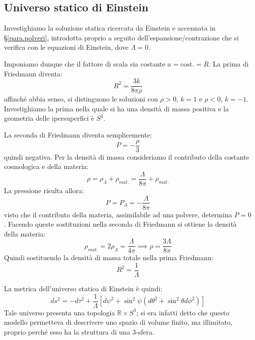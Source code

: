 \subsection{Universo statico di Einstein}
Investighiamo la soluzione statica ricercata da Einstein e accennata in \S\ref{para.polveri}, introdotta proprio a seguito dell'espansione/contrazione che si verifica con le  equazioni di Einstein, dove $\Lambda = 0$.

Imponiamo dunque che il fattore di scala sia costante $a = \textrm{cost.} = R$. La prima di Friedmann diventa:
\begin{equation*}
    R^2 = \frac{3k}{8\pi\rho}
\end{equation*}
affinché abbia senso, si distinguono le soluzioni con $\rho>0$, $k=1$ e $\rho<0$, $k=-1$. Investighiamo la prima nella quale si ha una densità di massa positiva e la geometria delle ipersuperfici è $S^3$.

La seconda di Friedmann diventa semplicemente:
\begin{equation*}
    P = - \frac{\rho}{3}
\end{equation*}
quindi negativa. Per la densità di massa consideriamo il contributo della costante cosmologica e della materia:
\begin{equation*}
    \rho = \rho_\Lambda + \rho_{mat.} = \frac{\Lambda}{8\pi} + \rho_{mat.}
\end{equation*}
La pressione risulta allora:
\begin{equation*}
    P = P_\Lambda = - \frac{\Lambda}{8\pi}
\end{equation*}
visto che il contributo della materia, assimilabile ad una polvere, determina $P=0$. Facendo queste sostituzioni nella seconda di Friedmann si ottiene la densità della materia:
\begin{equation*}
    \rho_{mat.} = 2\rho_\Lambda = \frac{\Lambda}{4\pi} \implies \rho = \frac{3\Lambda}{8\pi}
\end{equation*}
Quindi sostituendo la densità di massa totale nella prima Friedmann:
\begin{equation*}
    R^2 = \frac{1}{\Lambda} 
\end{equation*}

La metrica dell'universo statico di Einstein è quindi:
\begin{equation*}
    ds^2 = - d\tau^2 + \frac{1}{\Lambda}\left[ d\psi^2 + \sin^2\psi( d\theta^2 + \sin^2\theta d\phi^2)\right]
\end{equation*}
Tale universo presenta una topologia $\mathbb{R}\times S^3$; si era infatti detto che questo modello permetteva di descrivere uno spazio di volume finito, ma illimitato, proprio perché esso ha la struttura di una 3-sfera.

